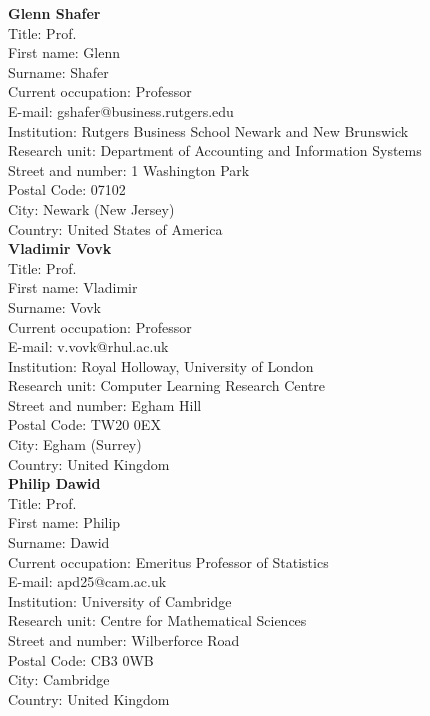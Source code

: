 \documentclass[11pt,dvipsnames,usenames,a4paper]{article}
\begin{document}
\newpage
{\bf Glenn Shafer}\\
Title: Prof.\\
First name: Glenn\\
Surname:  Shafer \\
Current occupation: Professor\\
E-mail: gshafer@business.rutgers.edu
\\
Institution: Rutgers Business School Newark and New Brunswick\\
Research unit: Department of Accounting and Information Systems\\
Street and number: 1 Washington Park\\
Postal Code: 07102\\
City: Newark (New Jersey)\\
Country: United States of America\\[-7pt]

{\bf Vladimir Vovk}\\
Title: Prof.\\
First name: Vladimir\\
Surname:  Vovk\\
Current occupation: Professor\\
E-mail: v.vovk@rhul.ac.uk\\
Institution: Royal Holloway, University of London\\
Research unit: Computer Learning Research Centre\\
Street and number: Egham Hill\\
Postal Code: TW20 0EX\\
City: Egham (Surrey)\\
Country: United Kingdom\\[-7pt]

{\bf Philip Dawid}\\
Title: Prof.\\
First name: Philip\\
Surname:  Dawid\\
Current occupation: Emeritus Professor of Statistics\\
E-mail:  apd25@cam.ac.uk\\
Institution: University of Cambridge\\
Research unit: Centre for Mathematical Sciences\\
Street and number: Wilberforce Road\\
Postal Code: CB3 0WB\\
City: Cambridge\\
Country: United Kingdom\\[-7pt]
\end{document}

